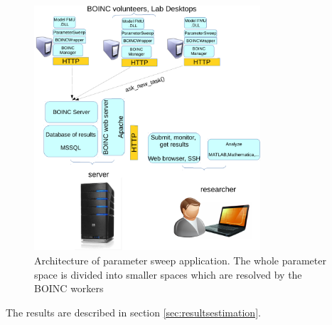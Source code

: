 \begin{figure}[htb]
    \centering
     \includegraphics[page=1,width=0.75\textwidth]{chapter3/architekturaparamsweep-crop.pdf}    
    \caption{Architecture of parameter sweep application. The whole parameter space is divided into smaller spaces which are resolved by the BOINC workers}
    \label{fig:paramsweeparch}
\end{figure}

The results are described in section \ref{sec:resultsestimation}.

